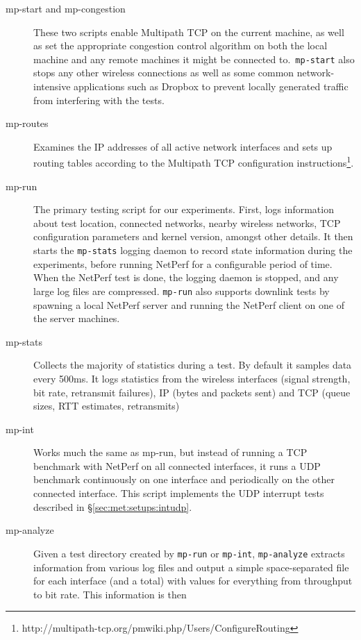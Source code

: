 \begin{description}
  \item[mp-start and mp-congestion]
    These two scripts enable Multipath TCP on the current machine, as well as
    set the appropriate congestion control algorithm on both the local machine
    and any remote machines it might be connected to.\ \texttt{mp-start} also
    stops any other wireless connections as well as some common
    network-intensive applications such as Dropbox to prevent locally generated traffic
    from interfering with the tests.
  \item[mp-routes]
    Examines the IP addresses of all active network interfaces and sets up
    routing tables according to the Multipath TCP configuration
    instructions\footnote{http://multipath-tcp.org/pmwiki.php/Users/ConfigureRouting}.
  \item[mp-run]
    The primary testing script for our experiments. First, logs information
    about test location, connected networks, nearby wireless networks, TCP
    configuration parameters and kernel version, amongst other details. It then starts
    the \texttt{mp-stats} logging daemon to record state information during the
    experiments, before running NetPerf for a configurable period of
    time. When the NetPerf test is done, the logging daemon is stopped, and any
    large log files are compressed. \texttt{mp-run} also supports downlink tests
    by spawning a local NetPerf server and running the NetPerf client on one of
    the server machines.
  \item[mp-stats]
    Collects the majority of statistics during a test. By default it samples
    data every 500ms. It logs statistics from the wireless interfaces (signal
    strength, bit rate, retransmit failures), IP (bytes and packets sent) and
    TCP (queue sizes, RTT estimates, retransmits)
  \item[mp-int]
    Works much the same as mp-run, but instead of running a TCP benchmark with
    NetPerf on all connected interfaces, it runs a UDP benchmark
    continuously on one interface and periodically on the other connected
    interface. This script implements the UDP interrupt tests described in
    \S\ref{sec:met:setups:intudp}.
  \item[mp-analyze]
    Given a test directory created by \texttt{mp-run} or \texttt{mp-int},
    \texttt{mp-analyze} extracts information from various log files and
    output a simple space-separated file for each interface (and a total) with
    values for everything from throughput to bit rate. This information is then

\end{description}
